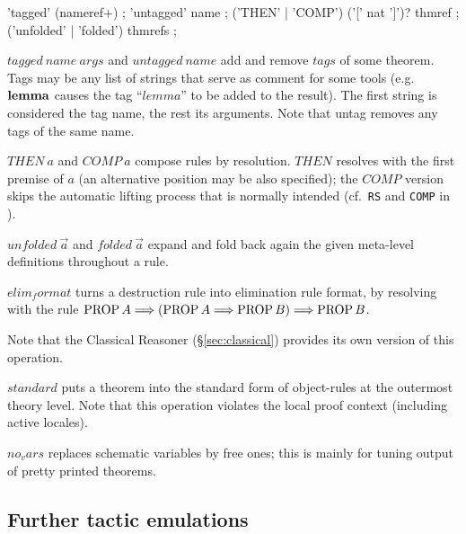 \begin{rail}
  'tagged' (nameref+)
  ;
  'untagged' name
  ;
  ('THEN' | 'COMP') ('[' nat ']')? thmref
  ;
  ('unfolded' | 'folded') thmrefs
  ;
\end{rail}

\begin{descr}

\item [$tagged~name~args$ and $untagged~name$] add and remove $tags$ of some
  theorem.  Tags may be any list of strings that serve as comment for some
  tools (e.g.\ ${\mathord{\mathbf{lemma}}}$ causes the tag ``$lemma$'' to be added to the
  result).  The first string is considered the tag name, the rest its
  arguments.  Note that untag removes any tags of the same name.

\item [$THEN~a$ and $COMP~a$] compose rules by resolution.  $THEN$ resolves
  with the first premise of $a$ (an alternative position may be also
  specified); the $COMP$ version skips the automatic lifting process that is
  normally intended (cf.\ \texttt{RS} and \texttt{COMP} in
  \cite[\S5]{isabelle-ref}).

\item [$unfolded~\vec a$ and $folded~\vec a$] expand and fold back again the
  given meta-level definitions throughout a rule.

\item [$elim_format$] turns a destruction rule into elimination rule format,
  by resolving with the rule $\mathop{\mathrm{PROP}} A \Longrightarrow (\mathop{\mathrm{PROP}} A \Longrightarrow \mathop{\mathrm{PROP}} B) \Longrightarrow \mathop{\mathrm{PROP}}
  B$.
  
  Note that the Classical Reasoner (\S\ref{sec:classical}) provides its own
  version of this operation.

\item [$standard$] puts a theorem into the standard form of object-rules at
  the outermost theory level.  Note that this operation violates the local
  proof context (including active locales).

\item [$no_vars$] replaces schematic variables by free ones; this is mainly
  for tuning output of pretty printed theorems.

\end{descr}


\subsection{Further tactic emulations}\label{sec:tactics}

